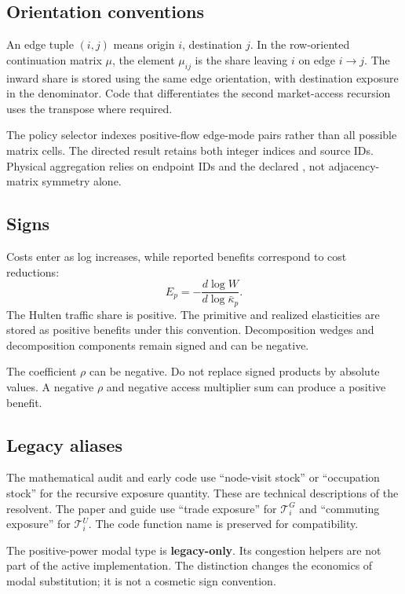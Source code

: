 \subsection{Orientation conventions}

An edge tuple \((i,j)\) means origin \(i\), destination \(j\). In the
row-oriented continuation matrix \(\mu\), the element \(\mu_{ij}\) is the share
leaving \(i\) on edge \(i\to j\). The inward share is stored using the same edge orientation,
with destination exposure in the denominator. Code that differentiates the
second market-access recursion uses the transpose where required.

The policy selector indexes positive-flow edge-mode pairs rather than all
possible matrix cells. The directed result retains both integer indices and
source IDs.
Physical aggregation relies on endpoint IDs and the declared
, not adjacency-matrix symmetry alone.

\subsection{Signs}

Costs enter as log increases, while reported benefits correspond to cost
reductions:
\[
 E_p=-\frac{d\log W}{d\log\bar\kappa_p}.
\]
The Hulten traffic share is positive. The primitive and realized elasticities
are stored as positive benefits under this convention. Decomposition wedges
and decomposition components remain signed and can be negative.

The coefficient \(\rho\) can be negative. Do not replace signed products by
absolute values. A negative \(\rho\) and negative access multiplier sum can
produce a positive benefit.

\subsection{Legacy aliases}

The mathematical audit and early code use ``node-visit stock'' or
``occupation stock'' for the recursive exposure quantity. These are technical
descriptions of the resolvent. The paper and guide use ``trade exposure'' for
\(\mathcal T_i^G\) and ``commuting exposure'' for \(\mathcal T_i^U\). The
code function name is preserved for compatibility.

The positive-power modal type  is \textbf{legacy-only}.
Its congestion helpers are not part of the active 
implementation. The distinction changes the economics of modal substitution;
it is not a cosmetic sign convention.
